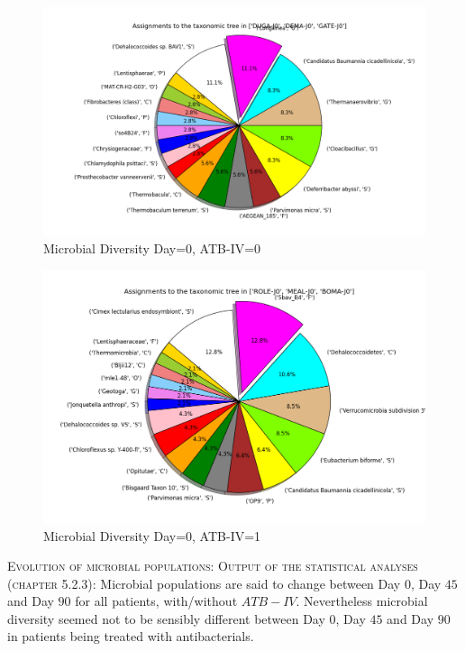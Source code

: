 \documentclass{report}
\begin{document}
\begin{itemize}
           \begin{figure}[H]
             \centering
             \includegraphics[scale=0.4]{illustrations/diversityDay0ATB0.png}
             \caption{Microbial Diversity Day=0, ATB-IV=0}
           \end{figure}

           \begin{figure}[H]
             \centering
             \includegraphics[scale=0.4]{illustrations/diversityDay0ATB1.png}
             \caption{Microbial Diversity Day=0, ATB-IV=1}
           \end{figure}
         \end{itemize}

\item \textsc{Evolution of microbial populations:}
       \textsc{Output of the statistical analyses (chapter 5.2.3):} Microbial populations are said to change between Day $0$, Day $45$ and Day $90$ for all patients, with/without $ATB-IV$. Nevertheless microbial diversity seemed not to be sensibly different between Day $0$, Day $45$ and Day $90$ in patients being treated with antibacterials.\\
\end{document}
